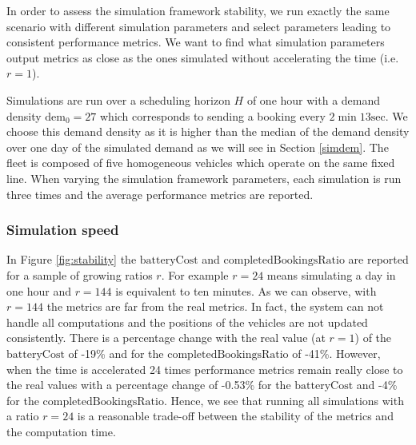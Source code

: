 \documentclass[12pt,a4paper]{article}
\begin{document}
In order to assess the simulation framework stability, we run exactly the same scenario with different simulation parameters and select parameters leading to consistent performance metrics. We want to find what simulation parameters output metrics as close as the ones simulated without accelerating the time (i.e. $r=1$).

Simulations are run over a scheduling horizon $H$ of one hour with a demand density $\text{dem}_{0} = 27$ which corresponds to sending a booking every $2\min13\text{sec}$. We choose this demand density as it is higher than the median of the demand density over one day of the simulated demand as we will see in Section \ref{simdem}. The fleet is composed of five homogeneous vehicles which operate on the same fixed line. When varying the simulation framework parameters, each simulation is run three times and the average performance metrics are reported. 

\subsubsection{Simulation speed} In Figure \ref{fig:stability} the $\text{batteryCost}$ and $\text{completedBookingsRatio}$ are reported for a sample of growing ratios $r$. For example $r = 24$ means simulating a day in one hour and $r=144$ is equivalent to ten minutes. As we can observe, with $r = 144$ the metrics are far from the real metrics. In fact, the system can not handle all computations and the positions of the vehicles are not updated consistently. There is a percentage change with the real value (at $r=1$) of the $\text{batteryCost}$ of -19\% and for the $\text{completedBookingsRatio}$ of -41\%. However, when the time is accelerated 24 times performance metrics remain really close to the real values with a percentage change of -0.53\% for the $\text{batteryCost}$ and -4\% for the $\text{completedBookingsRatio}$. Hence, we see that running all simulations with a ratio $r=24$ is a reasonable trade-off between the stability of the metrics and the computation time.
\end{document}
